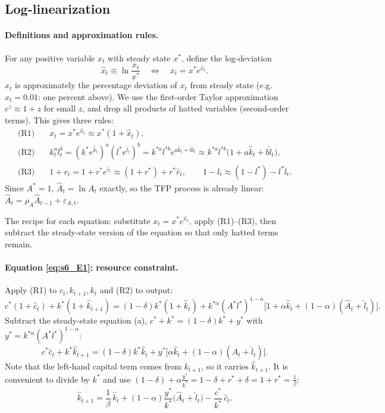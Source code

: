 \subsection{Log-linearization }

\paragraph{Definitions and approximation rules.} For any positive variable $x_t$ with steady state $x^*$, define the log-deviation
\[
\hat x_t\equiv\ln\frac{x_t}{x^*}\quad\Longleftrightarrow\quad x_t=x^*e^{\hat x_t}.
\]
$\hat x_t$ is approximately the percentage deviation of $x_t$ from steady state (e.g.\ $\hat x_t=0.01$: one percent above). We use the first-order Taylor approximation $e^{z}\approx1+z$ for small $z$, and drop all products of hatted variables (second-order terms). This gives three rules:
\begin{align*}
\text{(R1)}&\quad x_t=x^*e^{\hat x_t}\approx x^*(1+\hat x_t),\\
\text{(R2)}&\quad k_t^{a}l_t^{b}=(k^*e^{\hat k_t})^{a}(l^*e^{\hat l_t})^{b}=k^{*a}l^{*b}e^{a\hat k_t+b\hat l_t}\approx k^{*a}l^{*b}\big(1+a\hat k_t+b\hat l_t\big),\\
\text{(R3)}&\quad 1+r_t=1+r^*e^{\hat r_t}\approx(1+r^*)+r^*\hat r_t,\qquad 1-l_t\approx(1-l^*)-l^*\hat l_t .
\end{align*}
Since $A^*=1$, $\hat A_t=\ln A_t$ exactly, so the TFP process is already linear: $\hat A_t=\rho_A\hat A_{t-1}+\varepsilon_{A,t}$.

The recipe for each equation: substitute $x_t=x^*e^{\hat x_t}$, apply (R1)--(R3), then subtract the steady-state version of the equation so that only hatted terms remain.

\paragraph{Equation \eqref{eq:s6_E1}: resource constraint.} Apply (R1) to $c_t,k_{t+1},k_t$ and (R2) to output:
\[
c^*(1+\hat c_t)+k^*(1+\hat k_{t+1})=(1-\delta)k^*(1+\hat k_t)+k^{*\alpha}(A^*l^*)^{1-\alpha}\big[1+\alpha\hat k_t+(1-\alpha)(\hat A_t+\hat l_t)\big].
\]
Subtract the steady-state equation (a), $c^*+k^*=(1-\delta)k^*+y^*$ with $y^*=k^{*\alpha}(A^*l^*)^{1-\alpha}$:
\begin{equation}\label{eq:s6_L1}
c^*\hat c_t+k^*\hat k_{t+1}=(1-\delta)k^*\hat k_t+y^*\big[\alpha\hat k_t+(1-\alpha)(\hat A_t+\hat l_t)\big].
\end{equation}
Note that the left-hand capital term comes from $k_{t+1}$, so it carries $\hat k_{t+1}$. It is convenient to divide by $k^*$ and use $(1-\delta)+\alpha\frac{y^*}{k^*}=1-\delta+r^*+\delta=1+r^*=\frac1\beta$:
\begin{equation}\label{eq:s6_L1b}
\hat k_{t+1}=\frac1\beta\,\hat k_t+(1-\alpha)\frac{y^*}{k^*}\big(\hat A_t+\hat l_t\big)-\frac{c^*}{k^*}\,\hat c_t .
\end{equation}


